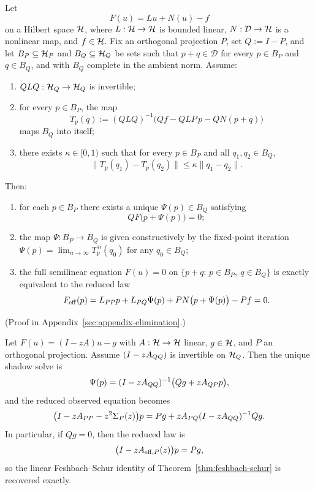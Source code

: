 \begin{proposition}
\label{prop:semicolon-shadow-elimination}
Let
\[
F(u)=Lu+N(u)-f
\]
on a Hilbert space $\mathcal{H}$, where $L:\mathcal{H}\to\mathcal{H}$ is bounded linear,
$N:\mathcal D\to\mathcal{H}$ is a nonlinear map, and $f\in\mathcal{H}$. Fix an orthogonal
projection $P$, set $Q:=I-P$, and let $B_P\subseteq \mathcal{H}_P$ and
$B_Q\subseteq \mathcal{H}_Q$ be sets such that $p+q\in\mathcal D$ for every
$p\in B_P$ and $q\in B_Q$, and with $B_Q$ complete in the ambient norm.
Assume:
\begin{enumerate}[label=(\roman*), leftmargin=2em, itemsep=0.2em]
\item $QLQ:\mathcal{H}_Q\to\mathcal{H}_Q$ is invertible;
\item for every $p\in B_P$, the map
      \[
      T_p(q):=(QLQ)^{-1}\bigl(Qf-QLP\,p-QN(p+q)\bigr)
      \]
      maps $B_Q$ into itself;
\item there exists $\kappa\in[0,1)$ such that for every $p\in B_P$ and all
      $q_1,q_2\in B_Q$,
      \[
      \|T_p(q_1)-T_p(q_2)\|\le \kappa \|q_1-q_2\|.
      \]
\end{enumerate}
Then:
\begin{enumerate}[label=(\roman*), leftmargin=2em, itemsep=0.2em]
\item for each $p\in B_P$ there exists a unique $\Psi(p)\in B_Q$ satisfying
      \[
      QF\bigl(p+\Psi(p)\bigr)=0;
      \]
\item the map $\Psi:B_P\to B_Q$ is given constructively by the fixed-point
      iteration $\Psi(p)=\lim_{n\to\infty}T_p^{\,n}(q_0)$ for any $q_0\in B_Q$;
\item the full semilinear equation $F(u)=0$ on
      $\{p+q:\,p\in B_P,\ q\in B_Q\}$ is exactly equivalent to the reduced law
      \[
      F_{\mathrm{eff}}(p)
      =
      L_{PP}p + L_{PQ}\Psi(p) + P N\bigl(p+\Psi(p)\bigr) - Pf
      =0.
      \]
\end{enumerate}
\end{proposition}

(Proof in Appendix~\ref{sec:appendix-elimination}.)

\begin{corollary}
\label{cor:linear-shadow-specialization}
Let $F(u)=(I-zA)u-g$ with $A:\mathcal{H}\to\mathcal{H}$ linear, $g\in\mathcal{H}$, and $P$ an
orthogonal projection. Assume $(I-zA_{QQ})$ is invertible on
$\mathcal{H}_{Q}$. Then the unique shadow solve is
\[
\Psi(p)
=
(I-zA_{QQ})^{-1}\bigl(Qg+zA_{QP}p\bigr),
\]
and the reduced observed equation becomes
\[
\bigl(I-zA_{PP}-z^2\Sigma_{P}(z)\bigr)p
=
Pg+zA_{PQ}(I-zA_{QQ})^{-1}Qg.
\]
In particular, if $Qg=0$, then the reduced law is
\[
\bigl(I-zA_{\mathrm{eff},P}(z)\bigr)p=Pg,
\]
so the linear Feshbach--Schur identity of
Theorem~\ref{thm:feshbach-schur} is recovered exactly.
\end{corollary}


